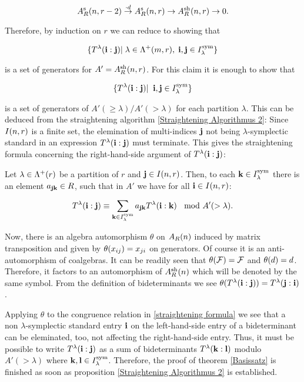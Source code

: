 \documentclass[twoside,12pt]{article}
\begin{document}
\[ A^{{\rm s}}_{R}(n,r-2)\stackrel{\cdot d}{\rightarrow} A^{{\rm s}}_{R}(n,r) \rightarrow A^{{\rm sh}}_{R}(n,r) \rightarrow 0. \]

Therefore, by induction on $r$ we can reduce to showing that

\[ \{ T^{\lambda}({\bf i}:{\bf j})|\; \lambda \in \Lambda^+(m, r),\;
{\bf i},{\bf j} \in I_{\lambda}^{\rm sym}\} \]

is a set of generators for $A'=A^{{\rm sh}}_{R}(n,r)$. For this claim it is
enough to show that

\[ \{ T^{\lambda}({\bf i}:{\bf j})|\;\;
{\bf i},{\bf j} \in I_{\lambda}^{\rm sym}\} \]

is a set of generators of $A'(\geq \lambda)/A'(>\lambda)$ for each partition
$\lambda$. This can be deduced from the straightening algorithm
 \ref{Straightening Algorithmus 2}: Since $I(n,r)$
is a finite set, the elemination of multi-indices ${\bf j}$  not being
 $\lambda$-symplectic standard  in an expression
$T^{\lambda}({\bf i}:{\bf j})$
must terminate. This gives the straightening formula
concerning the right-hand-side argument of $T^{\lambda}({\bf i}:{\bf j})$:

\begin{cor} \label{straightening formula}
Let $\lambda \in \Lambda^+(r)$ be a partition of $r$ and ${\bf j} \in I(n,r)$.
Then, to each ${\bf k}\in I_{\lambda}^{\rm sym}$ there is an element
$a_{{\bf j}{\bf k}} \in R$,
such that in $A'$ we have for all ${\bf i}\in I(n,r)$:


\[
T^{\lambda}({\bf i}:{\bf j}) \equiv \sum_{{\bf k} \in I_{\lambda}^{\rm sym}}
a_{{\bf j}{\bf k}}
T^{\lambda}({\bf i}:{\bf k}) \; \; \mbox{ mod } A'(>\lambda) .
\]
\end{cor}



Now, there is an algebra automorphism $\theta$ on $A_{R}(n)$ induced
by matrix transposition and given by $\theta (x_{i j})=x_{j i}$ on
generators. Of course it is an anti-automorphism of coalgebras. 
It can be readily seen that $\theta({\cal F})={\cal F}$ and $\theta
(d)=d$. Therefore, it factors to an automorphism of $A^{{\rm sh}}_{R}(n)$
which will be denoted by the same symbol. From the definition of
bideterminants we see $\theta(T^{\lambda}({\bf i}:{\bf j}))=T^{\lambda}({\bf j}:{\bf i})$.\Ab

Applying $\theta$ to the congruence relation in
\ref{straightening formula} we see that
a non $\lambda$-symplectic standard entry ${\bf i}$ on the left-hand-side
entry of a bideterminant can be eleminated, too, not
affecting the right-hand-side entry. Thus, it must be possible to
write $T^{\lambda}({\bf i}:{\bf j})$ as a sum of bideterminants
$T^{\lambda}({\bf k}:{\bf l})$ modulo $A'(>\lambda)$ where
${\bf k}, {\bf l} \in I_{\lambda}^{\rm sym}$. Therefore, the proof of
theorem \ref{Basissatz} is finished as soon as proposition
\ref{Straightening Algorithmus 2} is established.\Ab
\end{document}
